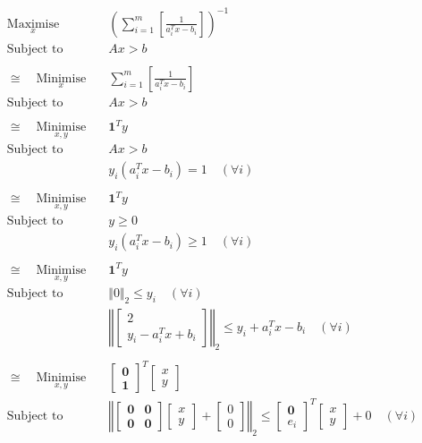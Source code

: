 \begin{align*}
    \underset{x}{\text{Maximise}} \quad & \left( \sum_{i=1}^{m}\left[ \frac{1}{a_i^T x - b_i} \right] \right)^{-1} \\
    \text{Subject to} \quad & Ax > b \\ \\
    \cong \quad \underset{x}{\text{Minimise}} \quad & \sum_{i=1}^{m}\left[ \frac{1}{a_i^T x - b_i} \right] \\
    \text{Subject to} \quad & Ax > b \\ \\
    \cong \quad \underset{x, y}{\text{Minimise}} \quad & \textbf{1}^T y \\
    \text{Subject to} \quad & Ax > b \\
    & y_i(a_i^T x - b_i) = 1 \quad (\forall i) \\ \\
    \cong \quad \underset{x, y}{\text{Minimise}} \quad & \textbf{1}^T y \\
    \text{Subject to} \quad & y \ge 0 \\
    & y_i(a_i^T x - b_i) \ge 1 \quad (\forall i) \\ \\
    \cong \quad \underset{x, y}{\text{Minimise}} \quad & \textbf{1}^T y \\
    \text{Subject to} \quad & \Vert 0 \Vert_2 \le y_i \quad (\forall i) \\
    & \left\Vert\begin{bmatrix}
        2 \\
        y_i - a_i^T x + b_i
    \end{bmatrix}\right\Vert_2 \le y_i + a_i^T x - b_i \quad (\forall i) \\ \\
    \cong \quad \underset{x, y}{\text{Minimise}} \quad & \begin{bmatrix} \mathbf{0} \\ \mathbf{1} \end{bmatrix}^T \begin{bmatrix} x \\ y \end{bmatrix} \\
    \text{Subject to} \quad & \left\Vert\begin{bmatrix} \mathbf{0} & \mathbf{0} \\ \mathbf{0} & \mathbf{0} \end{bmatrix}\begin{bmatrix} x \\ y \end{bmatrix} + \begin{bmatrix} 0 \\ 0 \end{bmatrix} \right\Vert_2 \le \begin{bmatrix} \mathbf{0} \\ e_i \end{bmatrix}^T \begin{bmatrix} x \\ y \end{bmatrix} + 0 \quad (\forall i) \\

\end{align*}

